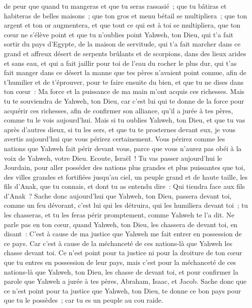 \begin{multicols}{2}
de peur que quand tu mangeras et que tu seras rassasié~; que tu bâtiras et habiteras de belles maisons~;
que ton gros et menu bétail se multipliera~; que ton argent et ton or augmentera, et que tout ce qui est à toi se multipliera,
que ton cœur ne s'élève point et que tu n'oublies point Yahweh, ton Dieu, qui t'a fait sortir du pays d'Egypte, de la maison de servitude,
qui t'a fait marcher dans ce grand et affreux désert de serpents brûlants et de scorpions, dans des lieux arides et sans eau, et qui a fait jaillir pour toi de l'eau du rocher le plus dur,
qui t'as fait manger dans ce désert la manne que tes pères n'avaient point connue, afin de t'humilier et de t'éprouver, pour te faire ensuite du bien,
et que tu ne dises dans ton cœur~: Ma force et la puissance de ma main m'ont acquis ces richesses.
Mais tu te souviendra de Yahweh, ton Dieu, car c'est lui qui te donne de la force pour acquérir ces richesses, afin de confirmer son alliance, qu'il a jurée à tes pères, comme tu le vois aujourd'hui.
Mais si tu oublies Yahweh, ton Dieu, et que tu vas après d'autres dieux, si tu les sers, et que tu te prosternes devant eux, je vous avertis aujourd'hui que vous périrez certainement.
Vous périrez comme les nations que Yahweh fait périr devant vous, parce que vous n'aurez pas obéi à la voix de Yahweh, votre Dieu.
\VerseOne{}Ecoute, Israël~! Tu vas passer aujourd'hui le Jourdain, pour aller posséder des nations plus grandes et plus puissantes que toi, des villes grandes et fortifiées jusqu'au ciel,
un peuple grand et de haute taille, les fils d'Anak, que tu connais, et dont tu as entendu dire~: Qui tiendra face aux fils d'Anak~?
Sache donc aujourd'hui que Yahweh, ton Dieu, passera devant toi, comme un feu dévorant, c'est lui qui les détruira, qui les humiliera devant toi~; tu les chasseras, et tu les feras périr promptement, comme Yahweh te l'a dit.
Ne parle pas en ton cœur, quand Yahweh, ton Dieu, les chassera de devant toi, en disant~: C'est à cause de ma justice que Yahweh me fait entrer en possession de ce pays. Car c'est à cause de la méchanceté de ces nations-là que Yahweh les chasse devant toi.
Ce n'est point pour ta justice ni pour la droiture de ton cœur que tu entres en possession de leur pays, mais c'est pour la méchanceté de ces nations-là que Yahweh, ton Dieu, les chasse de devant toi, et pour confirmer la parole que Yahweh a jurée à tes pères, Abraham, Isaac, et Jacob.
Sache donc que ce n'est point pour ta justice que Yahweh, ton Dieu, te donne ce bon pays pour que tu le possèdes~; car tu es un peuple au cou raide.

\end{multicols}
